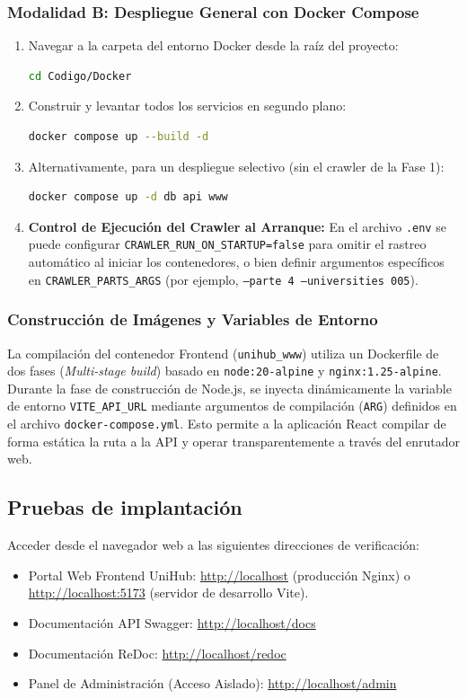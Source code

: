 \subsubsection{Modalidad B: Despliegue General con Docker Compose}
\begin{enumerate}
    \item Navegar a la carpeta del entorno Docker desde la raíz del proyecto:
        \begin{lstlisting}[language=bash]
cd Codigo/Docker
        \end{lstlisting}
    \item Construir y levantar todos los servicios en segundo plano:
        \begin{lstlisting}[language=bash]
docker compose up --build -d
        \end{lstlisting}
    \item Alternativamente, para un despliegue selectivo (sin el crawler de la Fase 1):
        \begin{lstlisting}[language=bash]
docker compose up -d db api www
        \end{lstlisting}
    \item \textbf{Control de Ejecución del Crawler al Arranque:} En el archivo \texttt{.env} se puede configurar \texttt{CRAWLER\_RUN\_ON\_STARTUP=false} para omitir el rastreo automático al iniciar los contenedores, o bien definir argumentos específicos en \texttt{CRAWLER\_PARTS\_ARGS} (por ejemplo, \texttt{--parte 4 --universities 005}).
\end{enumerate}

\subsubsection{Construcción de Imágenes y Variables de Entorno}
La compilación del contenedor Frontend (\texttt{unihub\_www}) utiliza un Dockerfile de dos fases (\emph{Multi-stage build}) basado en \texttt{node:20-alpine} y \texttt{nginx:1.25-alpine}. Durante la fase de construcción de Node.js, se inyecta dinámicamente la variable de entorno \texttt{VITE\_API\_URL} mediante argumentos de compilación (\texttt{ARG}) definidos en el archivo \texttt{docker-compose.yml}. Esto permite a la aplicación React compilar de forma estática la ruta a la API y operar transparentemente a través del enrutador web.

\subsection{Pruebas de implantación}
Acceder desde el navegador web a las siguientes direcciones de verificación:
\begin{itemize}
    \item Portal Web Frontend UniHub: \url{http://localhost} (producción Nginx) o \url{http://localhost:5173} (servidor de desarrollo Vite).
    \item Documentación API Swagger: \url{http://localhost/docs}
    \item Documentación ReDoc: \url{http://localhost/redoc}
    \item Panel de Administración (Acceso Aislado): \url{http://localhost/admin}
\end{itemize}

